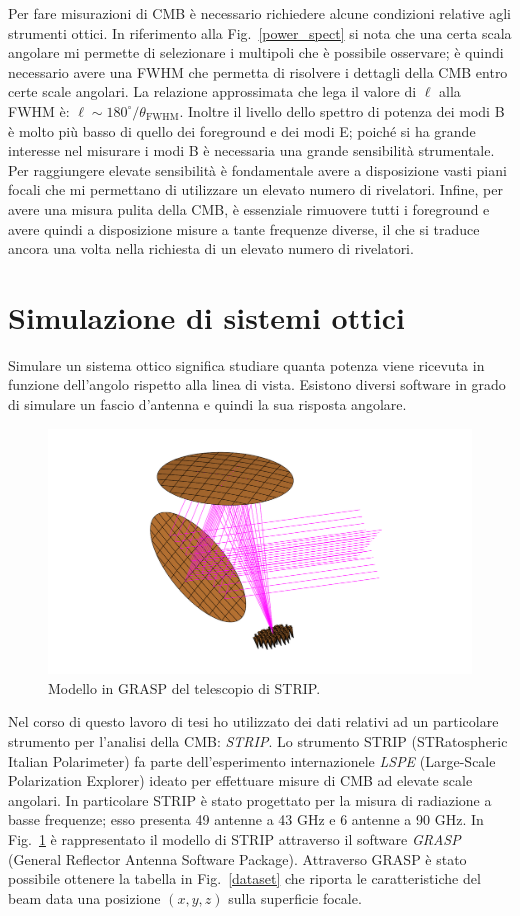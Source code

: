 \documentclass[12pt,a4paper,final]{book}
\begin{document}
Per fare misurazioni di CMB è necessario richiedere alcune condizioni relative agli strumenti ottici. In riferimento alla Fig.~\ref{power_spect} si nota che una certa scala angolare mi permette di selezionare i multipoli che è possibile osservare; è quindi necessario avere una FWHM che permetta di risolvere i dettagli della CMB entro certe scale angolari. La relazione approssimata che lega il valore di $\ell$ alla FWHM è: $\ell\sim{180^{\circ}}/{\theta_\text{FWHM}}$.
Inoltre il livello dello spettro di potenza dei modi B è molto più basso di quello dei foreground e dei modi E; poiché si ha grande interesse nel misurare i modi B è necessaria una grande sensibilità strumentale. Per raggiungere elevate sensibilità è fondamentale avere a disposizione vasti piani focali che mi permettano di utilizzare un elevato numero di rivelatori.
Infine, per avere una misura pulita della CMB, è essenziale rimuovere tutti i foreground e avere quindi a disposizione misure a tante frequenze diverse, il che si traduce ancora una volta nella richiesta di un elevato numero di rivelatori.




\section{Simulazione di sistemi ottici}\label{simulazioni}
Simulare un sistema ottico significa studiare quanta potenza viene ricevuta in funzione dell'angolo rispetto alla linea di vista. 
Esistono diversi software in grado di simulare un fascio d'antenna e quindi la sua risposta angolare.

\begin{figure}[!ht]
	\centering
	\includegraphics[width=0.6\linewidth]{../figures/strip.png}
	\caption{Modello in GRASP del telescopio di STRIP.}
	\label{strip}
\end{figure}

Nel corso di questo lavoro di tesi ho utilizzato dei dati relativi ad un particolare strumento per l'analisi della CMB: \textit{STRIP}.
Lo strumento STRIP (STRatospheric Italian Polarimeter) fa parte dell'esperimento internazionele \textit{LSPE} (Large-Scale Polarization Explorer) ideato per effettuare misure di CMB ad elevate scale angolari.
In particolare STRIP è stato progettato per la misura di radiazione a basse frequenze; esso presenta 49 antenne a 43 GHz e 6 antenne a 90 GHz. In Fig.~\ref{strip} è rappresentato il modello di STRIP attraverso il software \textit{GRASP} (General Reflector Antenna Software Package).
Attraverso GRASP è stato possibile ottenere la tabella in Fig.~\ref{dataset} che riporta le caratteristiche del beam data una posizione $(x, y, z)$ sulla superficie focale.
\end{document}
